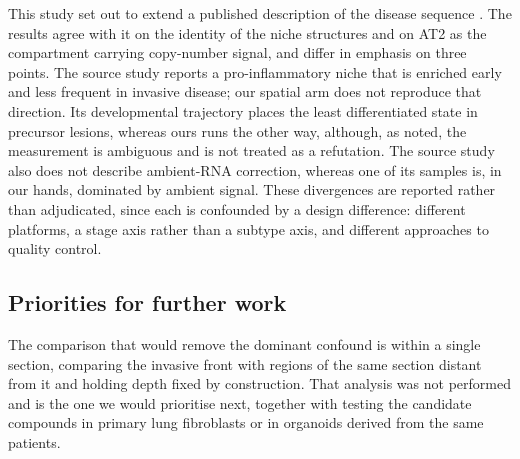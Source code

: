 This study set out to extend a published description of the disease sequence
\citep{peng2026}. The results agree with it on the identity of the niche structures and on
AT2 as the compartment carrying copy-number signal, and differ in emphasis on three points.
The source study reports a pro-inflammatory niche that is enriched early and less frequent
in invasive disease; our spatial arm does not reproduce that direction. Its developmental
trajectory places the least differentiated state in precursor lesions, whereas ours runs the
other way, although, as noted, the measurement is ambiguous and is not treated as a
refutation. The source study also does not describe ambient-RNA correction, whereas one of
its samples is, in our hands, dominated by ambient signal. These divergences are reported
rather than adjudicated, since each is confounded by a design difference: different
platforms, a stage axis rather than a subtype axis, and different approaches to quality
control.

\subsection{Priorities for further work}

The comparison that would remove the dominant confound is within a single section, comparing
the invasive front with regions of the same section distant from it and holding depth fixed
by construction. That analysis was not performed and is the one we would prioritise next,
together with testing the candidate compounds in primary lung fibroblasts or in organoids
derived from the same patients.

